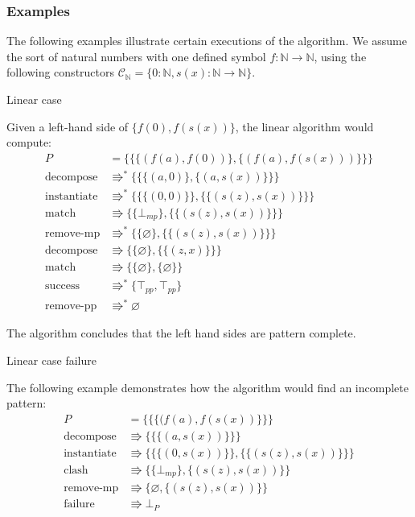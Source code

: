 \subsubsection{Examples} \label{examples-alg}

The following examples illustrate certain executions of the algorithm. We assume the sort of natural numbers with one defined symbol $f : \mathbb{N} \rightarrow \mathbb{N}$, using the following constructors $\mathcal{C}_{\mathbb{N}} = \{0 : \mathbb{N}, s(x) : \mathbb{N} \rightarrow \mathbb{N}\}$.

\begin{example} Linear case \label{ex-thiemann-lin}

Given a left-hand side of $\{f(0), f(s(x))\}$, the linear algorithm would compute:
\begin{align*}
    P &= \{\{\{(f(a), f(0))\}, \{(f(a), f(s(x)))\}\}\}\\
\text{decompose} &\Rrightarrow^{*} \{\{\{(a, 0)\}, \{(a, s(x))\}\}\} \\
\text{instantiate} &\Rrightarrow^{*} \{\{\{(0, 0)\}\}, \{\{(s(z), s(x))\}\}\} \\
\text{match} &\Rrightarrow \{\{\bot_{mp}\}, \{\{(s(z), s(x))\}\}\} \\
\text{remove-mp} &\Rrightarrow^{*} \{\{\varnothing\}, \{\{(s(z), s(x))\}\}\} \\
\text{decompose} &\Rrightarrow \{\{\varnothing\}, \{\{(z, x)\}\}\} \\
\text{match} &\Rrightarrow \{\{\varnothing\}, \{\varnothing\}\} \\
\text{success} &\Rrightarrow^{*} \{\top_{pp}, \top_{pp}\} \\
\text{remove-pp} &\Rrightarrow^{*} \varnothing
\end{align*}
\end{example}

The algorithm concludes that the left hand sides are pattern complete.

\begin{example} Linear case failure \label{ex-thiemann-lin-fail}

The following example demonstrates how the algorithm would find an incomplete pattern:
\begin{align*}
    P &= \{\{\{(f(a), f(s(x))\}\}\}\\
\text{decompose} &\Rrightarrow \{\{\{(a, s(x))\}\}\} \\
\text{instantiate} &\Rrightarrow \{\{\{(0, s(x))\}\}, \{\{(s(z), s(x))\}\}\} \\
\text{clash} &\Rrightarrow \{\{\bot_{mp}\}, \{(s(z), s(x))\}\} \\
\text{remove-mp} &\Rrightarrow \{\varnothing, \{(s(z), s(x))\}\} \\
\text{failure} &\Rrightarrow \bot_{P}
\end{align*}
\end{example}

